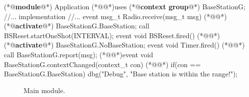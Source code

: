 \begin{Sbox}
\begin{minipage}{\columnwidth}
\begin{csource}
(*@\textbf{module}@*) Application {
  (*@@*)uses (*@\textbf{context group}@*) BaseStationG;
  //...
}implementation {
  //...
   event msg_t Radio.receive(msg_t msg) {
  (*@@*) (*@\textbf{activate}@*) BaseStationG.BaseStation;
    call BSReset.startOneShot(INTERVAL);}
   event void BSReset.fired() {
  (*@@*) (*@\textbf{activate}@*) BaseStationG.NoBaseStation;}
   event void Timer.fired() {
  (*@@*) call BaseStationG.report(msg);}
  (*@@*)event void BaseStationG.contextChanged(context_t con) {
  (*@@*) if(con == BaseStationG.BaseStation)
      dbg("Debug", "Base station is within the range!");}}
\end{csource}
\end{minipage}
\end{Sbox}
\begin{figure}[!h]
 \TheSbox
 \caption{Main module.}
 \label{fig:mm}
\end{figure}